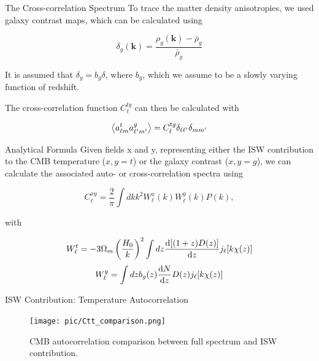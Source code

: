 \documentclass[serif, aspectratio=169]{beamer}
\begin{document}
\begin{frame}{The Cross-correlation Spectrum}
    To trace the matter density anisotropies, we used galaxy contrast maps, which can be calculated using

    \begin{equation}
        \delta_g(\mathbf{k})=\frac{\rho_g(\mathbf{k})-\bar{\rho}_g}{\bar{\rho}_g}
    \end{equation}

    It is assumed that $\delta_g=b_g\delta$, where $b_g$, which we assume to be a slowly varying function of redshift. 

    The cross-correlation function $C_\ell^{tg}$ can then be calculated with

    \begin{equation}
        \left\langle a_{\ell m}^t a_{\ell'm'}^g \right\rangle=C_\ell^{tg}\delta_{\ell \ell'}\delta_{mm'}
    \end{equation}
\end{frame}

\begin{frame}{Analytical Formula}
    Given fields x and y, representing either the ISW contribution to the CMB temperature ($x,y=t$) or the galaxy contrast ($x,y=g$), we can calculate the associated auto- or cross-correlation spectra using \cite{Moura-Santos_2016}

    \begin{equation}
        C_\ell^{xy}=\frac{2}{\pi}\int dk k^2 W_\ell^x(k)W_\ell^y(k)P(k),
    \end{equation}

    with

    \begin{equation}
        W_\ell^t=-3\Omega_m\left(\frac{H_0}{k}\right)^2\int dz \dv{[(1+z)D(z)]}{z}j_\ell[k\chi(z)]
    \end{equation}
    \begin{equation}\label{Wg}
        W_\ell^g=\int dz b_g(z)\dv{N}{z}D(z)j_\ell[k\chi(z)]
    \end{equation}
\end{frame}

\begin{frame}{ISW Contribution: Temperature Autocorrelation}
    \begin{figure}
        \centering
        \texttt{[image: pic/Ctt\_comparison.png]}
        \caption{CMB autocorrelation comparison between full spectrum and ISW contribution.}
        \label{fig:ISWplots_Ctt}
    \end{figure}
\end{frame}
\end{document}
